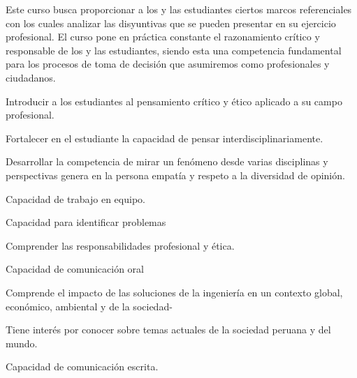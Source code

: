 \begin{syllabus}


\begin{justification}
Este curso busca proporcionar a los y las estudiantes ciertos marcos referenciales con los cuales analizar las disyuntivas que se pueden presentar en su ejercicio profesional. El curso pone en práctica constante el razonamiento crítico y responsable de los  y las estudiantes, siendo esta una competencia fundamental para los procesos de toma de decisión que asumiremos como profesionales y ciudadanos.
\end{justification}

\begin{goals}
\item Introducir a los estudiantes al pensamiento crítico y ético aplicado a su campo profesional.
\item Fortalecer en el estudiante la capacidad de pensar interdisciplinariamente.
\item Desarrollar la competencia de mirar un fenómeno desde varias disciplinas y perspectivas genera en la persona empatía y respeto a la diversidad de opinión.
\item Capacidad de trabajo en equipo.
\item Capacidad para identificar problemas
\item Comprender las responsabilidades profesional y ética.
\item Capacidad de comunicación oral
\item Comprende el impacto de las soluciones de la ingeniería en un contexto global, económico, ambiental y de la sociedad-
\item Tiene interés por conocer sobre temas actuales de la sociedad peruana y del mundo.
\item Capacidad de comunicación escrita.
\end{goals}

\begin{outcomes}
\end{outcomes}

\begin{competences}
    \item {}
    \item {}
    \item {}
    \item {}
\end{competences}


\end{syllabus}
